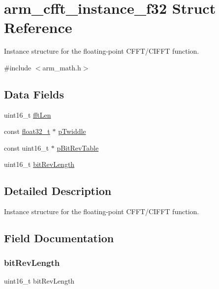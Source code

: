 \hypertarget{structarm__cfft__instance__f32}{}\section{arm\+\_\+cfft\+\_\+instance\+\_\+f32 Struct Reference}
\label{structarm__cfft__instance__f32}


Instance structure for the floating-\/point C\+F\+F\+T/\+C\+I\+F\+FT function.  




{\ttfamily \#include $<$arm\+\_\+math.\+h$>$}

\subsection*{Data Fields}
\begin{DoxyCompactItemize}
\item 
uint16\+\_\+t \mbox{\hyperlink{structarm__cfft__instance__f32_ab8db3bbe7c61e6bb8ca2a55e3446e11a}{fft\+Len}}
\item 
const \mbox{\hyperlink{arm__math_8h_a4611b605e45ab401f02cab15c5e38715}{float32\+\_\+t}} $\ast$ \mbox{\hyperlink{structarm__cfft__instance__f32_a8292d9775f5c5472f59915649fe3b378}{p\+Twiddle}}
\item 
const uint16\+\_\+t $\ast$ \mbox{\hyperlink{structarm__cfft__instance__f32_a3b229432d381b0a511a9cdbe3aa74e78}{p\+Bit\+Rev\+Table}}
\item 
uint16\+\_\+t \mbox{\hyperlink{structarm__cfft__instance__f32_a65e1b3e327b8fab9404287ed8f347cc8}{bit\+Rev\+Length}}
\end{DoxyCompactItemize}


\subsection{Detailed Description}
Instance structure for the floating-\/point C\+F\+F\+T/\+C\+I\+F\+FT function. 

\subsection{Field Documentation}
\mbox{\label{structarm__cfft__instance__f32_a65e1b3e327b8fab9404287ed8f347cc8}} 
\subsubsection{\texorpdfstring{bitRevLength}{bitRevLength}}
{\footnotesize\ttfamily uint16\+\_\+t bit\+Rev\+Length}

